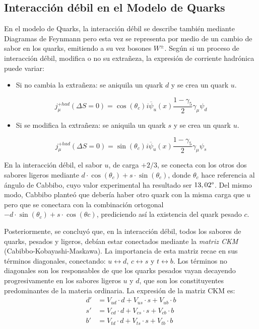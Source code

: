 \subsection{Interacción débil en el Modelo de Quarks}\label{sec:weak_int_quarks}
En el modelo de Quarks, la interacción débil se describe también mediante Diagramas de Feynmann pero esta vez se representa por medio de un cambio de sabor en los quarks, emitiendo a su vez bosones $W^{\pm}$. Según si un proceso de interacción débil, modifica o no su extrañeza, la expresión de corriente hadrónica puede variar:
\begin{itemize}
\item Si no cambia la extrañeza: se aniquila un quark $d$ y se crea un quark $u$.
\end{itemize}
\begin{equation*}
j_{\mu}^{+had}(\Delta S= 0)=\cos \left( \theta _{c}\right) i\overline{\psi }_{u}\left( x\right) \dfrac{1-\gamma _{5}}{2}\gamma _{\mu }\psi _{d}
\end{equation*}
\begin{itemize}
\item Si se modifica la extrañeza: se aniquila un quark $s$ y se crea un quark $u$.
\end{itemize}
\begin{equation*}
j_{\mu}^{+had}(\Delta S= 0)=\sin \left( \theta _{c}\right) i\overline{\psi }_{u}\left( x\right) \dfrac{1-\gamma _{5}}{2}\gamma _{\mu }\psi _{s}
\end{equation*}

En la interacción débil, el sabor $u$, de carga $+2/3$, se conecta con los otros dos sabores ligeros mediante $d\cdot \cos \left( \theta _{c}\right) +s\cdot \sin \left( \theta _{c}\right)$, donde $\theta _{c}$ hace referencia al ángulo de Cabbibo, cuyo valor experimental ha resultado ser $13,02\degree$. Del mismo modo, Cabbibo planteó que debería haber otro quark con la misma carga que $u$ pero que se conectara con la combinación ortogonal $-d\cdot \sin \left( \theta _{c}\right) +s\cdot \cos \left( \theta c\right)$, prediciendo así la existencia del quark pesado $c$.

Posteriormente, se concluyó que, en la interacción débil, todos los sabores de quarks, pesados y ligeros, debían estar conectados mediante la \textit{matriz CKM} (Cabibbo-Kobayashi-Maskawa). La importancia de esta matriz recae en sus términos diagonales, conectando: $u\leftrightarrow d$, $c\leftrightarrow s$ y $t\leftrightarrow b$. Los términos no diagonales son los responsables de que los quarks pesados vayan decayendo progresivamente en los sabores ligeros $u$ y $d$, que son los constituyentes predominantes de la materia ordinaria. La expresión de la matriz CKM es:
\begin{align}
d' &= V_{ud}\cdot d+V_{us}\cdot s + V_{ub}\cdot b \nonumber \\
s' &= V_{cd}\cdot d+V_{cs}\cdot s + V_{cb}\cdot b \\
b' &= V_{td}\cdot d+V_{ts}\cdot s + V_{tb}\cdot b \nonumber\label{eq:CKM_matrix}
\end{align}

